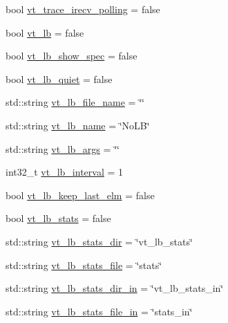 \begin{DoxyCompactItemize}
\item 
bool \hyperlink{structvt_1_1arguments_1_1_app_config_a7753691852b0b5475c953789173cf555}{vt\+\_\+trace\+\_\+irecv\+\_\+polling} = false
\item 
bool \hyperlink{structvt_1_1arguments_1_1_app_config_a7f1564af24349d7f524f7b509d92fd22}{vt\+\_\+lb} = false
\item 
bool \hyperlink{structvt_1_1arguments_1_1_app_config_aeec1d5697a4bfc5af3a8b763b88ae964}{vt\+\_\+lb\+\_\+show\+\_\+spec} = false
\item 
bool \hyperlink{structvt_1_1arguments_1_1_app_config_a7942c44d537f66f507209de26cbbb55d}{vt\+\_\+lb\+\_\+quiet} = false
\item 
std\+::string \hyperlink{structvt_1_1arguments_1_1_app_config_a53287cd1d5e9fbb62931b956b0770d93}{vt\+\_\+lb\+\_\+file\+\_\+name} = \char`\"{}\char`\"{}
\item 
std\+::string \hyperlink{structvt_1_1arguments_1_1_app_config_a1d8ed9d03eb82a15a81ad5e1ca6388b4}{vt\+\_\+lb\+\_\+name} = \char`\"{}No\+LB\char`\"{}
\item 
std\+::string \hyperlink{structvt_1_1arguments_1_1_app_config_ab2811622e1d9627bd2af4add74b7ffc9}{vt\+\_\+lb\+\_\+args} = \char`\"{}\char`\"{}
\item 
int32\+\_\+t \hyperlink{structvt_1_1arguments_1_1_app_config_a8d23afe2b4a2ac7d7354e3379f5b24ae}{vt\+\_\+lb\+\_\+interval} = 1
\item 
bool \hyperlink{structvt_1_1arguments_1_1_app_config_ab5dd6ec0c6828ff0ee8a539d63273e36}{vt\+\_\+lb\+\_\+keep\+\_\+last\+\_\+elm} = false
\item 
bool \hyperlink{structvt_1_1arguments_1_1_app_config_ae068940c3112fa20643649e22ecf6d20}{vt\+\_\+lb\+\_\+stats} = false
\item 
std\+::string \hyperlink{structvt_1_1arguments_1_1_app_config_adb78fa14bd7976375bfba0e01852729f}{vt\+\_\+lb\+\_\+stats\+\_\+dir} = \char`\"{}vt\+\_\+lb\+\_\+stats\char`\"{}
\item 
std\+::string \hyperlink{structvt_1_1arguments_1_1_app_config_a0e105137c152e366877505914c51c467}{vt\+\_\+lb\+\_\+stats\+\_\+file} = \char`\"{}stats\char`\"{}
\item 
std\+::string \hyperlink{structvt_1_1arguments_1_1_app_config_a8e3afb199f0e872d2840a5f27bcbd70f}{vt\+\_\+lb\+\_\+stats\+\_\+dir\+\_\+in} = \char`\"{}vt\+\_\+lb\+\_\+stats\+\_\+in\char`\"{}
\item 
std\+::string \hyperlink{structvt_1_1arguments_1_1_app_config_ae773bb249b36958811231e0ef079d502}{vt\+\_\+lb\+\_\+stats\+\_\+file\+\_\+in} = \char`\"{}stats\+\_\+in\char`\"{}

\end{DoxyCompactItemize}
